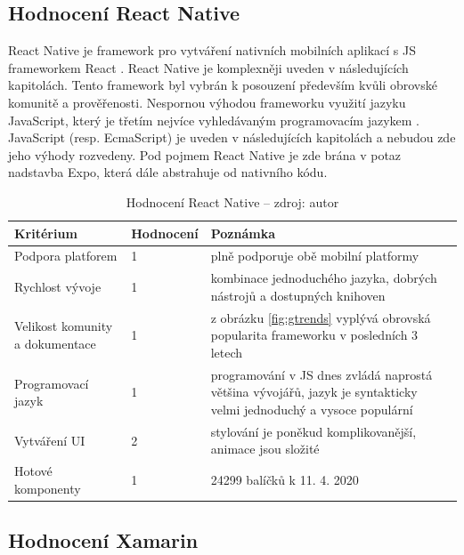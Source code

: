 \subsection{Hodnocení React Native}

React Native je framework pro vytváření nativních mobilních aplikací s JS frameworkem React \cite{novick2017react}. React Native je komplexněji uveden v následujících kapitolách. Tento framework byl vybrán k posouzení především kvůli obrovské komunitě a prověřenosti. Nespornou výhodou frameworku využití jazyku JavaScript, který je třetím nejvíce vyhledávaným programovacím jazykem \cite{Carbonnelle2020}. JavaScript (resp. EcmaScript) je uveden v následujících kapitolách a nebudou zde jeho výhody rozvedeny. Pod pojmem React Native je zde brána v potaz nadstavba Expo, která dále abstrahuje od nativního kódu.

\begin{table}[H]
	\begin{tabularx}{\textwidth}{| X | X | X |}
		\hline
		Kritérium                       & Hodnocení & Poznámka \\
		\hline
		Podpora platforem  & 1  & plně podporuje obě mobilní platformy \\
		\hline
		Rychlost vývoje                 & 1 & kombinace jednoduchého jazyka, dobrých nástrojů a dostupných knihoven \\
		\hline
		Velikost komunity a dokumentace & 1  & z obrázku \ref{fig:gtrends} vyplývá obrovská popularita frameworku v posledních 3 letech \\
		\hline
		Programovací jazyk              & 1 & programování v JS dnes zvládá naprostá většina vývojářů, jazyk je syntakticky velmi jednoduchý a vysoce populární         \\
		\hline
		Vytváření UI                    & 2 & stylování je poněkud komplikovanější, animace jsou složité         \\
		\hline
		Hotové komponenty               & 1 & 24299 balíčků k 11. 4. 2020  \\
		\hline
	\end{tabularx}
	\caption[Hodnocení React Native]{Hodnocení React Native -- zdroj: autor}
\end{table}

\subsection{Hodnocení Xamarin}



